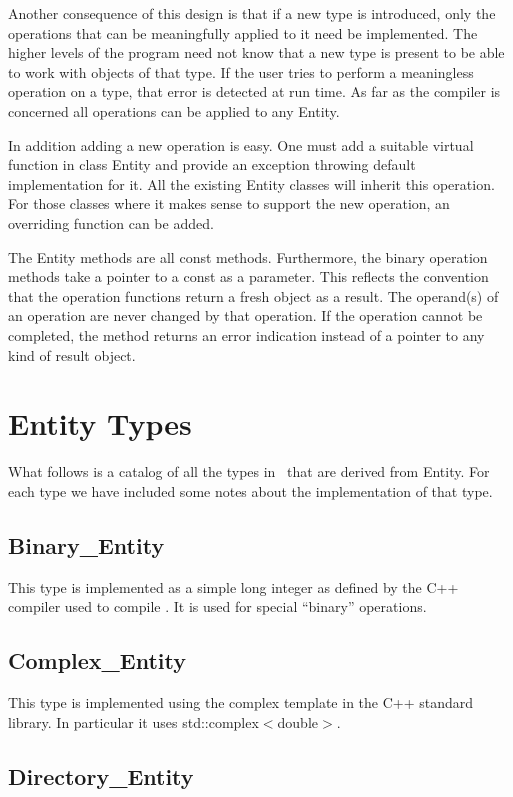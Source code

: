 \documentclass{report}
\begin{document}
Another consequence of this design is that if a new type is introduced, only the operations that
can be meaningfully applied to it need be implemented. The higher levels of the program need not
know that a new type is present to be able to work with objects of that type. If the user tries
to perform a meaningless operation on a type, that error is detected at run time. As far as the
compiler is concerned all operations can be applied to any Entity.

In addition adding a new operation is easy. One must add a suitable virtual function in class
Entity and provide an exception throwing default implementation for it. All the existing Entity
classes will inherit this operation. For those classes where it makes sense to support the new
operation, an overriding function can be added.

The Entity methods are all const methods. Furthermore, the binary operation methods take a
pointer to a const as a parameter. This reflects the convention that the operation functions
return a fresh object as a result. The operand(s) of an operation are never changed by that
operation. If the operation cannot be completed, the method returns an error indication instead
of a pointer to any kind of result object.

\section{Entity Types}

What follows is a catalog of all the types in \CLAC\ that are derived from Entity. For each type
we have included some notes about the implementation of that type.

\subsection{Binary\_Entity}

This type is implemented as a simple long integer as defined by the C++ compiler used to compile
\CLAC. It is used for special ``binary'' operations.

\subsection{Complex\_Entity}

This type is implemented using the complex template in the C++ standard library. In particular
it uses std::complex$<$double$>$.

\subsection{Directory\_Entity}
\end{document}
